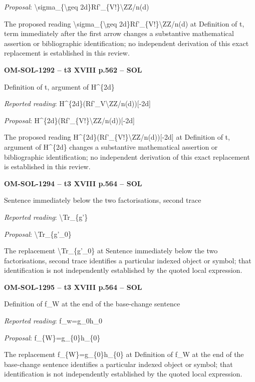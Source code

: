 \emph{Proposal}: \textbackslash{}sigma\_\{\textbackslash{}geq 2d\}Rf'\_\{V!\}\textbackslash{}ZZ/n(d)\par
The proposed reading \textbackslash{}sigma\_\{\textbackslash{}geq 2d\}Rf'\_\{V!\}\textbackslash{}ZZ/n(d) at Definition of t, term immediately after the first arrow changes a substantive mathematical assertion or bibliographic identification; no independent derivation of this exact replacement is established in this review.\par
\par\noindent\textbf{OM-SOL-1292 -- t3 XVIII p.562 -- SOL}\par
Definition of t, argument of H\textasciicircum{}\{2d\}\par
\emph{Reported reading}: H\textasciicircum{}\{2d\}(Rf'\_V\textbackslash{}ZZ/n(d))[-2d]\par
\emph{Proposal}: H\textasciicircum{}\{2d\}(Rf'\_\{V!\}\textbackslash{}ZZ/n(d))[-2d]\par
The proposed reading H\textasciicircum{}\{2d\}(Rf'\_\{V!\}\textbackslash{}ZZ/n(d))[-2d] at Definition of t, argument of H\textasciicircum{}\{2d\} changes a substantive mathematical assertion or bibliographic identification; no independent derivation of this exact replacement is established in this review.\par
\par\noindent\textbf{OM-SOL-1294 -- t3 XVIII p.564 -- SOL}\par
Sentence immediately below the two factorisations, second trace\par
\emph{Reported reading}: \textbackslash{}Tr\_\{g'\}\par
\emph{Proposal}: \textbackslash{}Tr\_\{g'\_0\}\par
The replacement \textbackslash{}Tr\_\{g'\_0\} at Sentence immediately below the two factorisations, second trace identifies a particular indexed object or symbol; that identification is not independently established by the quoted local expression.\par
\par\noindent\textbf{OM-SOL-1295 -- t3 XVIII p.564 -- SOL}\par
Definition of f\_W at the end of the base-change sentence\par
\emph{Reported reading}: f\_w=\allowbreak g\_0h\_0\par
\emph{Proposal}: f\_\{W\}=\allowbreak g\_\{0\}h\_\{0\}\par
The replacement f\_\{W\}=\allowbreak g\_\{0\}h\_\{0\} at Definition of f\_W at the end of the base-change sentence identifies a particular indexed object or symbol; that identification is not independently established by the quoted local expression.\par
